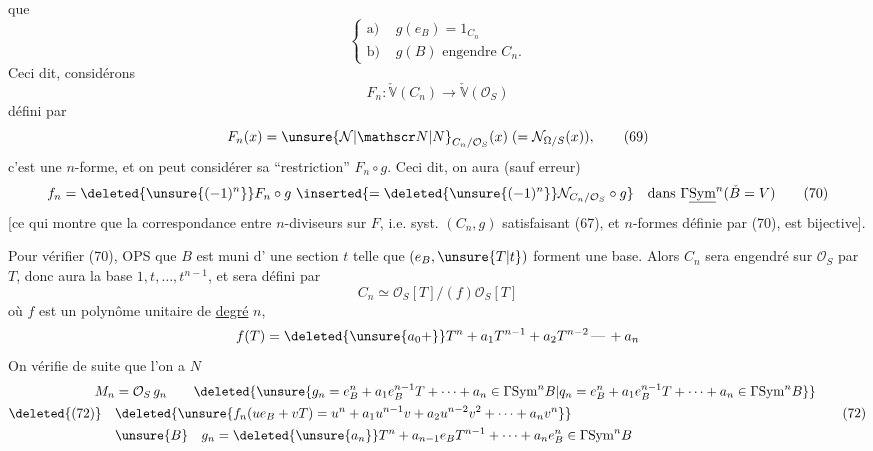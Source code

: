  que
\[
\left\{\begin{aligned}\text{a) }&g(e_B)=1_{C_n}\\
\text{b) }&g(B)\text{ engendre }C_n.
\end{aligned}\right. \tag*{(67)}
\]
Ceci dit, considérons  
\[
F_n:\check{\mathbb V}(C_n)\longrightarrow\check{\mathbb V}(\mathcal O_S) \tag*{(68)}
\]
défini par
\[
 F_n(x)=\unsure{\mathcal N|\mathscr N|N}_{C_n/\mathcal O_S}(x)\;(=\mathcal N_{\Omega/S}(x)), \tag*{(69)}
\]
c'est une $n$-forme, et on peut considérer
sa ``restriction'' $F_n\circ g$. Ceci dit, on
aura (sauf erreur)
\[
 f_n=\deleted{\unsure{(-1)^n}}F_n\circ g\ \inserted{=\deleted{\unsure{(-1)^n}}\mathcal N_{C_n/\mathcal O_S}\circ g}\quad\text{dans }\Gamma\underline{\mathrm{Sym}}^n(\check B=V) \tag*{(70)}
\]
[ce qui montre que la correspondance
entre $n$-diviseurs sur $F$,  i.e. syst. $(C_n,g)$
satisfaisant (67), et $n$-formes définie par
(70), est bijective].

Pour vérifier (70), OPS que $B$ est muni d'
une section $t$ telle que $(e_B,\unsure{T|t})$ forment une
base. Alors $C_n$ sera engendré sur $\mathcal O_S$ par  $T$,
donc aura la base $1,t,\ldots,t^{n-1}$, et sera défini
par
\[
 C_n\simeq\mathcal O_S[T]/(f)\mathcal O_S[T] \tag*{(71)}
\]
où $f$ est un polynôme unitaire  de \uline{degré} $n$,
\[
 f(T)=\deleted{\unsure{a_0+}}T^n+a_1T^{n-1}+a_2T^{n-2}\,\text{---}\,+a_n
\]
On  vérifie de suite que l'on a $N$
\[
\begin{aligned}
 M_n&=\mathcal O_S\,g_n\qquad\deleted{\unsure{g_n=e_B^n+a_1 e_B^{n-1}T+\cdots+a_n\in\Gamma\mathrm{Sym}^n B|q_n=e_B^n+a_1e_B^{n-1}T+\cdots+a_n\in\Gamma\mathrm{Sym}^n B}}\\
 \deleted{(72)}\quad&\deleted{\unsure{f_n(u e_B+vT)=u^n+a_1u^{n-1}v+a_2u^{n-2}v^2+\cdots+a_nv^n}}\\
 &\unsure{B}\quad g_n=\deleted{\unsure{a_n}}T^n+a_{n-1}e_BT^{n-1}+\cdots+a_ne_B^n\in\Gamma\mathrm{Sym}^n B
\end{aligned}\tag*{(72)}
\]

